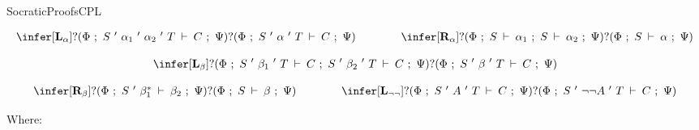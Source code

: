 
\newcommand{\ESTAR}{\mathbf{E}^*}

\calculusAcronym{\ESTAR}     





\maketitle


\begin{entry}{SocraticProofsCPL}  

\begin{calculus}

\[
\begin{array}{ccc}

\infer[\textbf{L}_\alpha]{?(\Phi ~;~  S ~'~ \alpha_{1} ~'~ \alpha_{2} ~'~ T\:\vdash\:C ~;~ \Psi)}{?(\Phi ~;~ S ~'~ \alpha ~'~ T\:\vdash\: C ~;~ \Psi)}

&~~~~~~&

\infer[\textbf{R}_{\alpha}]{?(\Phi ~;~  S\:\vdash\:\alpha_{1} ~;~ S\:\vdash\: \alpha_{2} ~;~ \Psi)}{?(\Phi ~;~ S\:\vdash\: \alpha ~;~ \Psi)}

\\
\end{array}
\]

$$
\infer[\textbf{L}_{\beta}]{?(\Phi ~;~  S ~'~ \beta_{1} ~'~ T\:\vdash\: C ~;~ S ~'~ \beta_{2} ~'~ T\:\vdash\: C ~;~ \Psi)}{?(\Phi ~;~ S ~'~ \beta ~'~ T\:\vdash\: C ~;~ \Psi)}
$$

\[
\begin{array}{ccc}

\infer[\textbf{R}_{\beta}]{?(\Phi ~;~  S ~'~ \beta^{*}_{1}\:\vdash\:\beta_{2} ~;~ \Psi)}{?(\Phi ~;~    S\:\vdash\:\beta ~;~ \Psi)}

&~~~~~~&

\infer[\textbf{L}_{\lnot \lnot}]{?(\Phi ~;~  S ~'~ A ~'~ T\:\vdash\: C ~;~ \Psi)}{?(\Phi ~;~  S ~'~ \lnot \lnot A ~'~ T\:\vdash\: C ~;~ \Psi)}

\\
\end{array}
\]

Where:


\end{calculus}
\end{entry}
